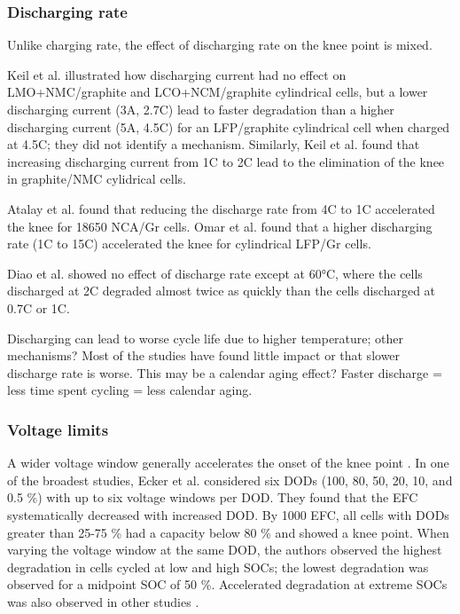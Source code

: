 \documentclass{article}
\begin{document}
\subsubsection{Discharging rate}

Unlike charging rate, the effect of discharging rate on the knee point is mixed.

Keil et al.\cite{keil_charging_2016} illustrated how discharging current had no effect on LMO+NMC/graphite and LCO+NCM/graphite cylindrical cells, but a lower discharging current (3A, 2.7C) lead to faster degradation than a higher discharging current (5A, 4.5C) for an LFP/graphite cylindrical cell when charged at 4.5C; they did not identify a mechanism. 
Similarly, Keil et al.\cite{keil_linear_2019} found that increasing discharging current from 1C to 2C lead to the elimination of the knee in graphite/NMC cylidrical cells.

Atalay et al.\cite{atalay_theory_2020} found that reducing the discharge rate from 4C to 1C accelerated the knee for 18650 NCA/Gr cells.
Omar et al. \cite{omar_lithium_2014} found that a higher discharging rate (1C to 15C) accelerated the knee for cylindrical LFP/Gr cells.

Diao et al.\cite{diao_accelerated_2019} showed no effect of discharge rate except at 60°C, where the cells discharged at 2C degraded almost twice as quickly than the cells discharged at 0.7C or 1C. 

Discharging can lead to worse cycle life due to higher temperature; other mechanisms? Most of the studies have found little impact or that slower discharge rate is worse. This may be a calendar aging effect? Faster discharge = less time spent cycling = less calendar aging. 

\subsubsection{Voltage limits} 
A wider voltage window generally accelerates the onset of the knee point \cite{ecker_calendar_2014, pfrang_long-term_2018, klett_non-uniform_2014, ma_novel_2019, petzl_lithium_2015, schuster_nonlinear_2015}. In one of the broadest studies, Ecker et al. \cite{ecker_calendar_2014} considered six DODs (100, 80, 50, 20, 10, and 0.5 \%) with up to six voltage windows per DOD. They found that the EFC systematically decreased with increased DOD. By 1000 EFC, all cells with DODs greater than 25-75 \% had a capacity below 80 \% and showed a knee point. When varying the voltage window at the same DOD, the authors observed the highest degradation in cells cycled at low and high SOCs; the lowest degradation was observed for a midpoint SOC of 50 \%. Accelerated degradation at extreme SOCs was also observed in other studies \cite{aiken_accelerated_2020,ma_novel_2019, zhu_investigation_2021}.
\end{document}
